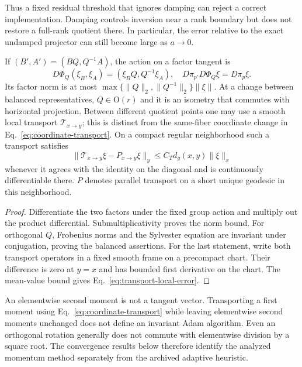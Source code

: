 Thus a fixed residual threshold that ignores damping can reject a correct
implementation. Damping controls inversion near a rank boundary but does
not restore a full-rank quotient there. In particular, the error relative
to the exact undamped projector can still become large as $a\to0$.

\begin{proposition}
\label{prop:transport}
If $(B',A')=(BQ,Q^{-1}A)$, the action on a factor tangent is
\begin{equation}
 D\Phi_Q(\xi_B,\xi_A)=(\xi_BQ,Q^{-1}\xi_A),
 \quad D\pi_{p'}D\Phi_Q\xi=D\pi_p\xi.
 \label{eq:coordinate-transport}
\end{equation}
Its factor norm is at most
$\max\{\|Q\|_2,\|Q^{-1}\|_2\}\|\xi\|$. At a change between balanced
representatives, $Q\in\mathrm O(r)$ and it is an isometry that commutes
with horizontal projection. Between different quotient points one may
use a smooth local transport $\mathcal T_{x\to y}$; this is distinct
from the same-fiber coordinate change in Eq.~\eqref{eq:coordinate-transport}.
On a compact regular neighborhood such a transport satisfies
\begin{equation}
 \|\mathcal T_{x\to y}\xi-P_{x\to y}\xi\|_y
 \leq C_T d_g(x,y)\|\xi\|_x
 \label{eq:transport-local-error}
\end{equation}
whenever it agrees with the identity on the diagonal and is continuously
differentiable there. $P$ denotes parallel transport on a short unique
geodesic in this neighborhood.
\end{proposition}
\begin{proof}
Differentiate the two factors under the fixed group action and multiply
out the product differential. Submultiplicativity proves the norm bound.
For orthogonal $Q$, Frobenius norms and the Sylvester equation are invariant
under conjugation, proving the balanced assertions. For the last statement,
write both transport operators in a fixed smooth frame on a precompact
chart. Their difference is zero at $y=x$ and has bounded first derivative
on the chart. The mean-value bound gives Eq.~\eqref{eq:transport-local-error}.
\end{proof}

An elementwise second moment is not a tangent vector. Transporting a first
moment using Eq.~\eqref{eq:coordinate-transport} while leaving elementwise
second moments unchanged does not define an invariant Adam algorithm.
Even an orthogonal rotation generally does not commute with elementwise
division by a square root. The convergence results below therefore identify
the analyzed momentum method separately from the archived adaptive heuristic.


